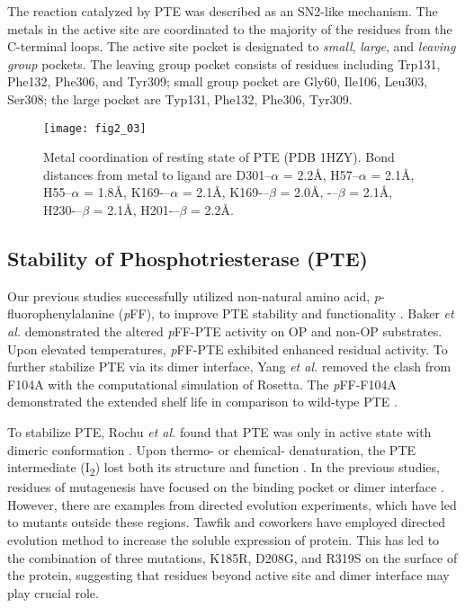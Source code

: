 \begin{refsection}
The reaction catalyzed by PTE was described as an SN2-like mechanism. The
metals in the active site are coordinated to the majority of the residues from
the C-terminal loops. The active site pocket is designated to \emph{small},
\emph{large}, and \emph{leaving group} pockets. The leaving group pocket
consists of residues including Trp131, Phe132, Phe306, and Tyr309; small group
pocket are Gly60, Ile106, Leu303, Ser308; the large pocket are Typ131, Phe132,
Phe306, Tyr309.
\begin{figure}[h!] 
    \centering 
    \texttt{[image: fig2\_03]}
    \caption[Metal
        coordination of resting state of PTE (PDB 1HZY). Bond distances from
        metal to ligand are D301--$\alpha$ = 2.2\AA, H57--$\alpha$ = 2.1\AA,
        H55--$\alpha$ = 1.8\AA, K169-–$\alpha$ = 2.1\AA, K169-–$\beta$ =
        2.0\AA, -–$\beta$ = 2.1\AA, H230-–$\beta$ = 2.1\AA,
    H201-–$\beta$ = 2.2\AA.]{Metal coordination of resting state of PTE (PDB
        1HZY). Bond distances from metal to ligand are D301--$\alpha$ = 2.2\AA,
        H57--$\alpha$ = 2.1\AA, H55--$\alpha$ = 1.8\AA, K169-–$\alpha$ =
        2.1\AA, K169-–$\beta$ = 2.0\AA,
    -–$\beta$ = 2.1\AA, H230-–$\beta$ = 2.1\AA, H201-–$\beta$ = 2.2\AA.} 
    \label{fig:pte-active-site-chap2}
\end{figure}

\subsection{Stability of Phosphotriesterase (PTE)}

Our previous studies successfully utilized non-natural amino acid,
\emph{p}-fluorophenylalanine (\emph{p}FF), to improve PTE stability and
functionality \cite{Baker2011b,Yang2014a}. Baker \emph{et al.} demonstrated the
altered \emph{p}FF-PTE activity on OP and non-OP substrates.  Upon elevated
temperatures, \emph{p}FF-PTE exhibited enhanced residual activity. To further
stabilize PTE via its dimer interface, Yang \emph{et al.} removed the clash
from F104A with the computational simulation of Rosetta. The \emph{p}FF-F104A
demonstrated the extended shelf life in comparison to wild-type
PTE \cite{Yang2014a}.

To stabilize PTE, Rochu \emph{et al.} found that PTE was only in active state
with dimeric conformation \cite{Rochu2002b}. Upon thermo- or chemical-
denaturation, the PTE intermediate (I\textsubscript{2}) lost both its structure
and function \cite{Rochu2002b,Grimsley1997b}. In the previous studies, residues of
mutagenesis have focused on the binding pocket or dimer interface 
\cite{Chen-Goodspeed2001a,Rochu2002b,Grimsley1997b}. However, there are examples
from directed evolution experiments, which have led to mutants outside these
regions. Tawfik and coworkers have employed directed evolution method to
increase the soluble expression of protein. This has led to the combination of
three mutations, K185R, D208G, and R319S on the surface of the protein,
suggesting that residues beyond active site and dimer interface may play
crucial role. 


\end{refsection}
